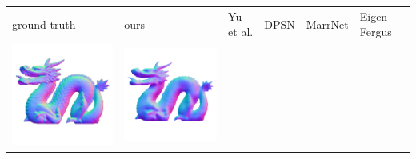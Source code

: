 \begin{center}
\begin{tabularx}{\linewidth}{@{}Y@{}Y@{}Y@{}Y@{}Y@{}Y@{}}
ground truth & ours & Yu et al. & DPSN & MarrNet & Eigen-Fergus \\
\includegraphics[width=\linewidth]{semisynthetic/20160617_21_gt.png} &
\includegraphics[width=\linewidth]{semisynthetic/20160617_21_ours_out.png} &

\end{tabularx}
\end{center}
